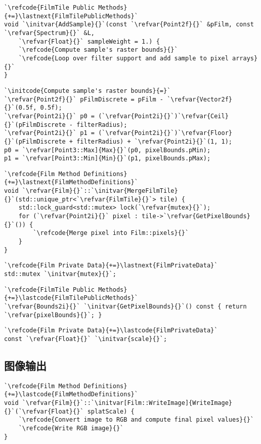 \begin{lstlisting}
`\refcode{FilmTile Public Methods}{+=}\lastnext{FilmTilePublicMethods}`
void `\initvar{AddSample}{}`(const `\refvar{Point2f}{}` &pFilm, const `\refvar{Spectrum}{}` &L,
    `\refvar{Float}{}` sampleWeight = 1.) {
    `\refcode{Compute sample's raster bounds}{}`
    `\refcode{Loop over filter support and add sample to pixel arrays}{}`
}
\end{lstlisting}

\begin{lstlisting}
`\initcode{Compute sample's raster bounds}{=}`
`\refvar{Point2f}{}` pFilmDiscrete = pFilm - `\refvar{Vector2f}{}`(0.5f, 0.5f);
`\refvar{Point2i}{}` p0 = (`\refvar{Point2i}{}`)`\refvar{Ceil}{}`(pFilmDiscrete - filterRadius);
`\refvar{Point2i}{}` p1 = (`\refvar{Point2i}{}`)`\refvar{Floor}{}`(pFilmDiscrete + filterRadius) + `\refvar{Point2i}{}`(1, 1);
p0 = `\refvar[Point3::Max]{Max}{}`(p0, pixelBounds.pMin);
p1 = `\refvar[Point3::Min]{Min}{}`(p1, pixelBounds.pMax);
\end{lstlisting}

\begin{lstlisting}
`\refcode{Film Method Definitions}{+=}\lastnext{FilmMethodDefinitions}`
void `\refvar{Film}{}`::`\initvar{MergeFilmTile}{}`(std::unique_ptr<`\refvar{FilmTile}{}`> tile) {
    std::lock_guard<std::mutex> lock(`\refvar{mutex}{}`);
    for (`\refvar{Point2i}{}` pixel : tile->`\refvar{GetPixelBounds}{}`()) {
        `\refcode{Merge pixel into Film::pixels}{}`
    }
}
\end{lstlisting}
\begin{lstlisting}
`\refcode{Film Private Data}{+=}\lastnext{FilmPrivateData}`
std::mutex `\initvar{mutex}{}`;
\end{lstlisting}
\begin{lstlisting}
`\refcode{FilmTile Public Methods}{+=}\lastcode{FilmTilePublicMethods}`
`\refvar{Bounds2i}{}` `\initvar{GetPixelBounds}{}`() const { return `\refvar{pixelBounds}{}`; }
\end{lstlisting}
\begin{lstlisting}
`\refcode{Film Private Data}{+=}\lastcode{FilmPrivateData}`
const `\refvar{Float}{}` `\initvar{scale}{}`;
\end{lstlisting}

\subsection{图像输出}\label{sub:图像输出}
\begin{lstlisting}
`\refcode{Film Method Definitions}{+=}\lastcode{FilmMethodDefinitions}`
void `\refvar{Film}{}`::`\initvar[Film::WriteImage]{WriteImage}{}`(`\refvar{Float}{}` splatScale) {
    `\refcode{Convert image to RGB and compute final pixel values}{}`
    `\refcode{Write RGB image}{}`
}
\end{lstlisting}